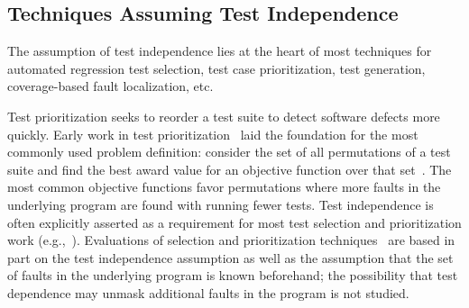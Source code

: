 

\subsection{Techniques Assuming Test Independence}

The assumption of test independence lies at the heart of most
techniques for automated regression test selection,
test case prioritization, test generation, coverage-based
fault localization, etc. 


Test prioritization seeks to reorder a test suite to detect
software defects more quickly. 
Early work in test
prioritization~\cite{Wong:1997:SER:851010.856115,Rothermel:1999:TCP:519621.853398}
laid the foundation for the most commonly used problem definition:
consider the set of all permutations of a test suite and find the best
award value for an objective function over that
set~\cite{Elbaum:2000:PTC:347324.348910}.  The most common objective
functions favor permutations where more faults in the underlying
program  are found with running fewer tests.
Test independence is often explicitly asserted as a
requirement for most test selection and prioritization work (e.g.,~\cite[p.~1500]{Rummel:2005:TPR:1066677.1067016}).
Evaluations of selection and prioritization techniques~\cite[\emph{et alia}]{Rothermel:1999:TCP:519621.853398,Do:2010:ETC:1907658.1908088}
are based in part on the test independence
assumption as well as the assumption that the set of faults in the underlying
program is known beforehand; the possibility that test dependence may unmask additional faults in the program is not studied.

